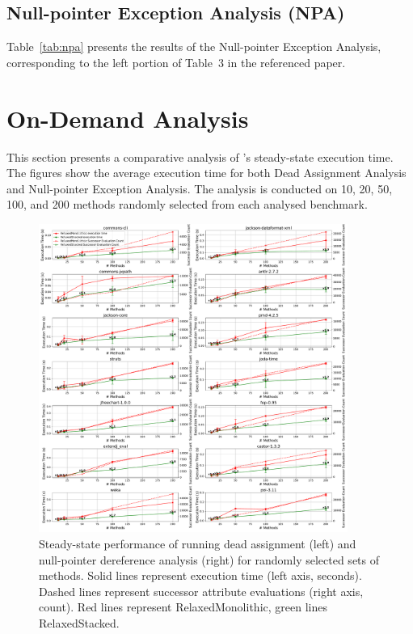 \documentclass[acmsmall, screen, review, nonacm]{acmart}
\begin{document}





\subsection{Null-pointer Exception Analysis (NPA)}
Table~\ref{tab:npa} presents the results of the Null-pointer Exception Analysis, corresponding to the left portion of Table~3 in the referenced paper.





\section{On-Demand Analysis}
This section presents a comparative analysis of \IntraJ{}'s steady-state execution time.
The figures show the average execution time for both Dead Assignment Analysis and Null-pointer Exception Analysis.
The analysis is conducted on 10, 20, 50, 100, and 200 methods randomly selected from each analysed benchmark.
\begin{figure}[H]
  \centering
  \includegraphics[width=0.9\textwidth]{intraj_ondemand_daa_relaxedmonolithic_vs_intraj_ondemand_daa_relaxedstackedon-demand.pdf}
  \caption{
    Steady-state performance of running dead assignment (left) and null-pointer dereference analysis (right) for randomly selected sets of methods. Solid lines represent execution time (left axis, seconds). Dashed lines represent successor attribute evaluations (right axis, count). Red lines represent RelaxedMonolithic, green lines RelaxedStacked.
  }
\end{figure}
\end{document}
